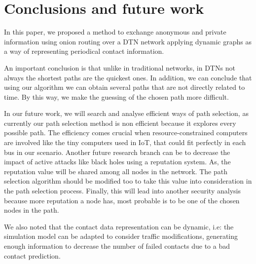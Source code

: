 \section{Conclusions and future work}\label{sec:conclusions}

In this paper, we proposed a method to  exchange anonymous and private information using onion routing over a DTN network applying dynamic graphs as a way of representing periodical contact information.

An important conclusion is that unlike in traditional networks, in DTNs not always the shortest paths are the quickest ones. In addition, we can conclude that using our algorithm we can obtain several paths that are not directly related to time. By this way, we make the guessing of the chosen path more difficult.

In our future work, we will search and analyse efficient ways of path selection, as currently our path selection method is non efficient because it explores every possible path. The efficiency comes crucial when resource-constrained computers are involved like the tiny computers used in IoT, that could fit perfectly in each bus in our scenario. Another future research branch can be to decrease the impact of active attacks like black holes using a reputation system. As, the reputation value will be shared among all nodes in the network. The path selection algorithm should be modified too to take this value into consideration in the path selection process. Finally, this will lead into another security analysis because more reputation a node has, most probable is to be one of the chosen nodes in the path.

We also noted that the contact data representation can be dynamic, i.e: the simulation model can be adapted to consider traffic modifications, generating enough information to decrease the number of  failed contacts due to a bad contact prediction.